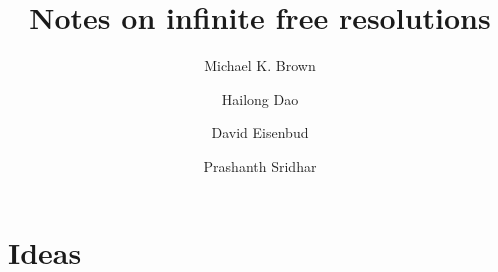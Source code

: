\documentclass[a4,12pt]{amsart}
\numberwithin{equation}{section}
\theoremstyle{definition}
\theoremstyle{remark}
\numberwithin{equation}{section}
\begin{document}
\setlength{\baselineskip}{14pt}
\title{Notes on infinite free resolutions}
\author{Michael K. Brown}


\author{Hailong Dao}

\author{David Eisenbud}
\author{Prashanth Sridhar}


\newcommand{\Addresses}{{
	\vskip\baselineskip
  	\footnotesize
  	\noindent \textsc{Department of Mathematics and Statistics, Auburn University} \par\nopagebreak
	\noindent \textit{E-mail addresses:} \texttt{mkb0096@auburn.edu, prashanth.sridhar0218@gmail.com}
  	\vskip\baselineskip
   \noindent \textsc{Department of Mathematics, University of California, Berkeley} \par\nopagebreak
	\noindent \textit{E-mail address:} \texttt{de@berkeley.edu}
  	\vskip\baselineskip
  	\noindent \textsc{Department of Mathematics, University of Kansas} \par\nopagebreak
	\noindent \textit{E-mail address:} \texttt{hdao@ku.edu}
}}


\keywords{} 
\subjclass[2010]{}
\maketitle


\section{Ideas}
\end{document}
